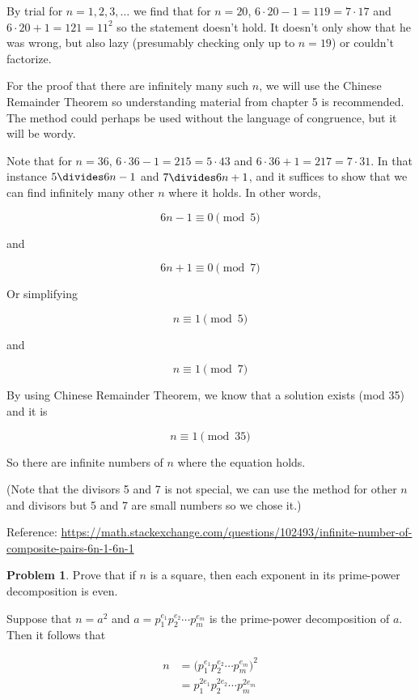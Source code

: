 \documentclass{article}
\theoremstyle{definition}
\newtheorem{problem}{Problem}[section]
\begin{document}
  By trial for $n = 1, 2, 3, \dots$ we find that for $n = 20$,
  $6 \cdot 20 - 1 = 119 = 7 \cdot 17$ and $6 \cdot 20 + 1 = 121 = 11^2$
  so the statement doesn't hold. It doesn't only show that he was wrong,
  but also lazy (presumably checking only up to $n = 19$) or couldn't factorize.
  
  For the proof that there are infinitely many such $n$, we will use the Chinese Remainder Theorem
  so understanding material from chapter 5 is recommended. The method could perhaps be used
  without the language of congruence, but it will be wordy.
  
  Note that for $n = 36$, $6 \cdot 36 - 1 = 215 = 5 \cdot 43$ and $6 \cdot 36 + 1 = 217 = 7 \cdot 31$.
  In that instance $5 \divides 6n - 1$ and $7 \divides 6n + 1$, and it suffices to show that we can find
  infinitely many other $n$ where it holds. In other words,
  
  \[6n - 1 \equiv 0 \pmod{5}\]
  
  and
  
  \[6n + 1 \equiv 0 \pmod{7}\]
  
  Or simplifying
  
  \[n \equiv 1 \pmod{5}\]
  
  and
  
  \[n \equiv 1 \pmod{7}\]
  
  By using Chinese Remainder Theorem, we know that a solution exists (mod 35) and it is
  
  \[n \equiv 1 \pmod{35}\]
  
  So there are infinite numbers of $n$ where the equation holds.
  
  (Note that the divisors 5 and 7 is not special, we can use the
  method for other $n$ and divisors but 5 and 7 are small numbers so we chose it.)
  
  Reference: \url{https://math.stackexchange.com/questions/102493/infinite-number-of-composite-pairs-6n-1-6n-1}
  
  \begin{problem}
    Prove that if $n$ is a square, then each exponent in its prime-power decomposition is even.
  \end{problem}
  
  Suppose that $n = a^2$ and $a = p_1^{e_1}p_2^{e_2} \cdots p_m^{e_m}$ is the prime-power
  decomposition of $a$. Then it follows that
  
  \begin{align*}
    n &= \big(p_1^{e_1}p_2^{e_2} \cdots p_m^{e_m}\big)^2 \\
    &= p_1^{2e_1}p_2^{2e_2} \cdots p_m^{2e_m}
  \end{align*}
  
\end{document}
